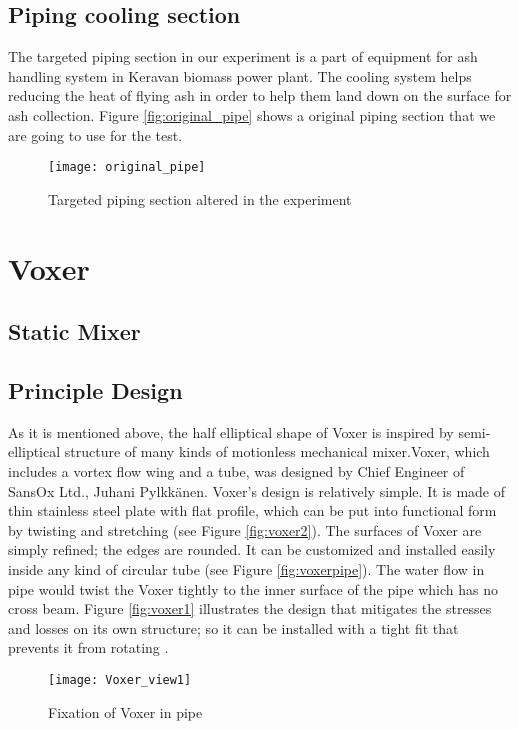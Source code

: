 \subsection{Piping cooling section}
The targeted piping section in our experiment is a part of equipment for ash handling system in Keravan biomass power plant. The cooling system helps reducing the heat of flying ash in order to help them land down on the surface for ash collection. Figure \vref{fig:original_pipe} shows a original piping section that we are going to use for the test. 

\begin{figure}[h]
  \centering
  \texttt{[image: original\_pipe]}
  \caption{ Targeted piping section altered in the experiment}
  \label{fig:original_pipe}
\end{figure}


\section{Voxer}
\subsection{Static Mixer}

\subsection{Principle Design}
As it is mentioned above, the half elliptical shape of Voxer is inspired by semi-elliptical structure of many kinds of motionless mechanical mixer.Voxer, which includes a vortex flow wing and a tube, was designed by Chief Engineer of SansOx Ltd., Juhani Pylkkänen. Voxer's design is relatively simple. It is made of thin stainless steel plate with flat profile, which can be put into functional form by twisting and stretching (see Figure \vref{fig:voxer2}). The surfaces of Voxer are simply refined; the edges are rounded. It can be customized and installed easily inside any kind of circular tube (see Figure \vref{fig:voxerpipe}). The water flow in pipe would twist the Voxer tightly to the inner surface of the pipe which has no cross beam. Figure \vref{fig:voxer1} illustrates the design that mitigates the stresses and losses on its own structure; so it can be installed with a tight fit that prevents it from rotating \cite{voxer:article}.

\begin{figure}[h]
  \centering
  \texttt{[image: Voxer\_view1]}
  \caption{ Fixation of Voxer in pipe \cite{voxer:article}}
  \label{fig:voxer1}
\end{figure}

